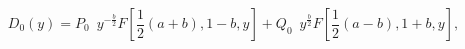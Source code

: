 \begin{equation}
D_0(y)=P_0\,\,\,y^{-\frac{b}{2}}F\left[ \frac{1}{2}\left(a+b
\right),1-
b,y\right] +Q_0\,\,\,y^{\frac{b}{2}}F\left[
\frac{1}{2}\left(a-b\right),1
+b,y\right],
\label{sol0}
\end{equation}

